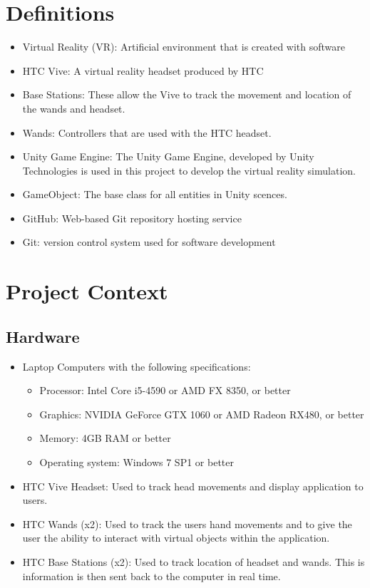 \documentclass[10pt,journal,compsoc,onecolumn, draftclsnofoot]{IEEEtran}
\begin{document}
\section{Definitions}
\begin{itemize}
  \item Virtual Reality (VR):  Artificial environment that is created with software
  \item HTC Vive: A virtual reality headset produced by HTC
  \item Base Stations: These allow the Vive to track the movement and location of the wands and headset.
  \item Wands: Controllers that are used with the HTC headset.
  \item Unity Game Engine: The Unity Game Engine, developed by Unity Technologies is used in this project to develop the virtual reality simulation.
  \item GameObject: The base class for all entities in Unity scences.
  \item GitHub: Web-based Git repository hosting service
  \item Git: version control system used for software development
\end{itemize}


\section{Project Context}
\subsection{Hardware}
\begin{itemize}
  \item Laptop Computers with the following specifications:
  \begin{itemize}
    \item Processor: Intel Core i5-4590 or AMD FX 8350, or better
    \item Graphics: NVIDIA GeForce GTX 1060 or AMD Radeon RX480, or better
    \item Memory: 4GB RAM or better
    \item Operating system: Windows 7 SP1 or better
  \end{itemize}
  \item HTC Vive Headset: Used to track head movements and display application to users.
  \item HTC Wands (x2): Used to track the users hand movements and to give the user the ability to interact with virtual objects within the application.
  \item HTC Base Stations (x2): Used to track location of headset and wands. This is information is then sent back to the computer in real time.
\end{itemize}
\end{document}
